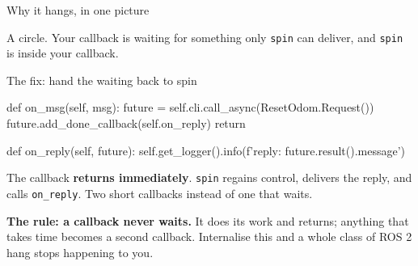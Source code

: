 \documentclass[aspectratio=169]{beamer}
\begin{document}
\begin{frame}{Why it hangs, in one picture}
  \begin{center}
  \end{center}

  \vspace{0.4em}
  \centering\small
  A circle. Your callback is waiting for something only \texttt{spin} can deliver, and
  \texttt{spin} is inside your callback.
\end{frame}

\begin{frame}[fragile]{The fix: hand the waiting back to spin}
  \begin{pycodes}
def on_msg(self, msg):
    future = self.cli.call_async(ResetOdom.Request())
    future.add_done_callback(self.on_reply)
    return

def on_reply(self, future):
    self.get_logger().info(f'reply: {future.result().message}')
  \end{pycodes}

  \footnotesize
  The callback \textbf{returns immediately}. \texttt{spin} regains control, delivers the reply,
  and calls \texttt{on\_reply}. Two short callbacks instead of one that waits.

  \begin{inthefield}
    \footnotesize
    \textbf{The rule: a callback never waits.} It does its work and returns; anything that
    takes time becomes a second callback. Internalise this and a whole class of ROS 2 hang
    stops happening to you.
  \end{inthefield}
\end{frame}
\end{document}
